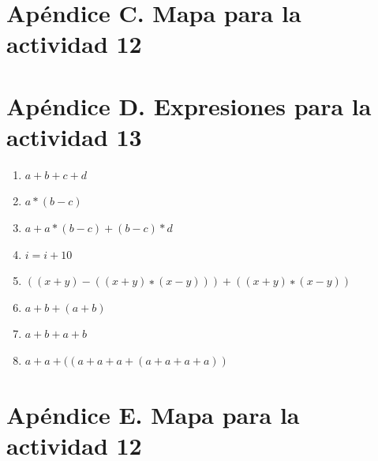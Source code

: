 \documentclass[11pt]{article}
\begin{document}
\newpage

\section{Apéndice C. Mapa para la actividad 12}

{\centering

}

\section{Apéndice D. Expresiones para la actividad 13}

\begin{enumerate}
\item $a+b+c+d$
\item $a*(b-c)$
\item $a + a * (b − c) + (b − c) * d$
\item $i = i + 10$
\item $((x + y) − ((x + y) ∗ (x − y))) + ((x + y) ∗ (x − y))$
\item $a + b + (a + b)$
\item $a + b + a + b$
\item $a + a + ((a + a + a + (a + a + a + a))$
\end{enumerate}
\newpage

\section{Apéndice E. Mapa para la actividad 12}

{\centering

}

\newpage
\end{document}
